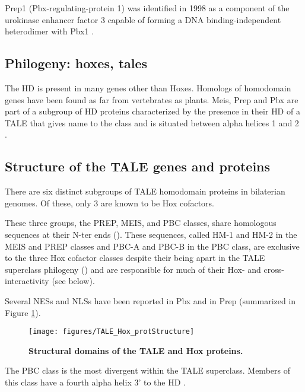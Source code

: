 Prep1 (Pbx-regulating-protein 1) was identified in 1998 as a component of the urokinase enhancer factor 3 capable of forming a DNA binding-independent heterodimer with Pbx1 \parencite{Berthelsen1998,Berthelsen1998a}.

\subsection{Philogeny: hoxes, tales}

The \ac{HD} is present in many genes other than Hoxes. Homologs of homodomain genes have been found as far from vertebrates as plants. Meis, Prep and Pbx are part of a subgroup of \ac{HD} proteins characterized by the presence in their \ac{HD} of a \ac{TALE} that gives name to the class and is situated between alpha helices 1 and 2 \parencite{Bertolino1995, Burglin1997, Mukherjee2007, Moens2006}. 
\subsection{Structure of the TALE genes and proteins}

There are six distinct subgroups of \ac{TALE} homodomain proteins in bilaterian genomes. Of these, only 3 are known to be Hox cofactors. %

These three groups, the PREP, MEIS, and PBC classes, share homologous sequences at their \ac{N-ter} ends (\cite{Burglin1998}). These sequences, called HM-1 and HM-2 in the MEIS and PREP classes and PBC-A and PBC-B in the PBC class, are exclusive to the three Hox cofactor classes despite their being apart in the \ac{TALE} superclass philogeny (\cite{Mukherjee2007}) and are responsible for much of their Hox- and cross-interactivity (see below).

Several \acp{NES} and \acp{NLS} have been reported in Pbx and in Prep (summarized in Figure \ref{fig:TALE_Hox_protStructure}).

\begin{figure}[]
  
  \centering
  \texttt{[image: figures/TALE\_Hox\_protStructure]}
  \caption[Structural domains of the TALE and Hox proteins]{\textbf{Structural domains of the TALE and Hox proteins.}}
  \label{fig:TALE_Hox_protStructure}
\end{figure}

The PBC class is the most divergent within the \ac{TALE} superclass. Members of this class have a fourth alpha helix 3' to the \ac{HD} \parencite{Mukherjee2007}. 

